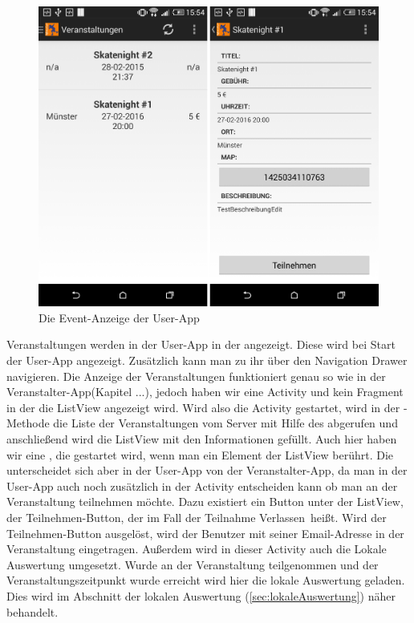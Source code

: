 \begin{figure}[htb]
\centering
\includegraphics[width=12cm]{graphics/show_events_user_app.png}
\caption{Die Event-Anzeige der User-App}
\label{fig:show_events_user_app}
\end{figure}

Veranstaltungen werden in der User-App in der  angezeigt. Diese wird bei Start der User-App angezeigt. Zusätzlich kann man zu ihr über den Navigation Drawer navigieren. Die Anzeige der Veranstaltungen funktioniert genau so wie in der Veranstalter-App(Kapitel ...), jedoch haben wir eine Activity und kein Fragment in der die ListView angezeigt wird. Wird also die Activity gestartet, wird in der -Methode die Liste der Veranstaltungen vom Server mit Hilfe des  abgerufen und anschließend wird die ListView mit den Informationen gefüllt. Auch hier haben wir eine , die gestartet wird, wenn man ein Element der ListView berührt. Die  unterscheidet sich aber in der User-App von der Veranstalter-App, da man in der User-App auch noch zusätzlich in der Activity entscheiden kann ob man an der Veranstaltung teilnehmen möchte. Dazu existiert ein Button unter der ListView, der \glqq Teilnehmen\grqq-Button, der im Fall der Teilnahme \glqq Verlassen\grqq\ heißt. Wird der \glqq Teilnehmen\grqq-Button ausgelöst, wird der Benutzer mit seiner Email-Adresse in der Veranstaltung eingetragen. Außerdem wird in dieser Activity auch die Lokale Auswertung umgesetzt. Wurde an der Veranstaltung teilgenommen und der Veranstaltungszeitpunkt wurde erreicht wird hier die lokale Auswertung geladen. Dies wird im Abschnitt der lokalen Auswertung (\ref{sec:lokaleAuswertung}) näher behandelt.
\FloatBarrier

